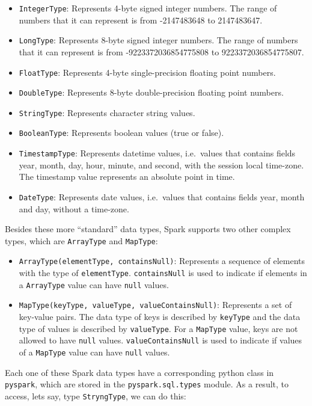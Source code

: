 \documentclass[
  11pt,
  letterpaper,
  DIV=11,
  numbers=noendperiod]{scrreprt}
\providecommand{\tightlist}{%
  \setlength{\itemsep}{0pt}\setlength{\parskip}{0pt}}\usepackage{longtable,booktabs,array}
\begin{document}
\begin{itemize}
\tightlist
\item
  \texttt{IntegerType}: Represents 4-byte signed integer numbers. The
  range of numbers that it can represent is from -2147483648 to
  2147483647.
\item
  \texttt{LongType}: Represents 8-byte signed integer numbers. The range
  of numbers that it can represent is from -9223372036854775808 to
  9223372036854775807.
\item
  \texttt{FloatType}: Represents 4-byte single-precision floating point
  numbers.
\item
  \texttt{DoubleType}: Represents 8-byte double-precision floating point
  numbers.
\item
  \texttt{StringType}: Represents character string values.
\item
  \texttt{BooleanType}: Represents boolean values (true or false).
\item
  \texttt{TimestampType}: Represents datetime values, i.e.~values that
  contains fields year, month, day, hour, minute, and second, with the
  session local time-zone. The timestamp value represents an absolute
  point in time.
\item
  \texttt{DateType}: Represents date values, i.e.~values that contains
  fields year, month and day, without a time-zone.
\end{itemize}

Besides these more ``standard'' data types, Spark supports two other
complex types, which are \texttt{ArrayType} and \texttt{MapType}:

\begin{itemize}
\item
  \texttt{ArrayType(elementType,\ containsNull)}: Represents a sequence
  of elements with the type of \texttt{elementType}.
  \texttt{containsNull} is used to indicate if elements in a
  \texttt{ArrayType} value can have \texttt{null} values.
\item
  \texttt{MapType(keyType,\ valueType,\ valueContainsNull)}: Represents
  a set of key-value pairs. The data type of keys is described by
  \texttt{keyType} and the data type of values is described by
  \texttt{valueType}. For a \texttt{MapType} value, keys are not allowed
  to have \texttt{null} values. \texttt{valueContainsNull} is used to
  indicate if values of a \texttt{MapType} value can have \texttt{null}
  values.
\end{itemize}

Each one of these Spark data types have a corresponding python class in
\texttt{pyspark}, which are stored in the \texttt{pyspark.sql.types}
module. As a result, to access, lets say, type \texttt{StryngType}, we
can do this:
\end{document}
